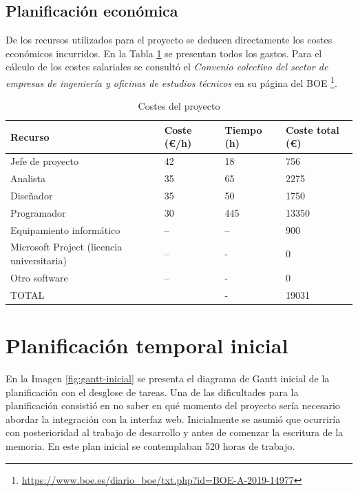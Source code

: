 \subsection{Planificación económica}

De los recursos utilizados para el proyecto se deducen directamente los costes económicos incurridos. En la Tabla \ref{tab:costes-proyecto} se presentan todos los gastos. Para el cálculo de los costes salariales se consultó el \emph{Convenio colectivo del sector de empresas de ingeniería y oficinas de estudios técnicos} en su página del BOE \footnote{\url{https://www.boe.es/diario_boe/txt.php?id=BOE-A-2019-14977}}.

\begin{table}[ht]
    \centering
    \begin{tabular}{l l l l}
        Recurso & Coste (€/h) & Tiempo (h) & Coste total (€) \\
        \hline
        \hline
        Jefe de proyecto & 42 & 18 & 756 \\
        Analista & 35 & 65 & 2275 \\
        Diseñador & 35 & 50 & 1750 \\
        Programador & 30 & 445 & 13350 \\
        Equipamiento informático & -- & -- & 900 \\
        Microsoft Project (licencia universitaria) & -- & - & 0 \\
		Otro software & -- & - & 0 \\    
        \hline
        \hline
        TOTAL & & - & 19031 \\        
    \end{tabular}
	\caption{Costes del proyecto}    
	\label{tab:costes-proyecto}
\end{table}

\section{Planificación temporal inicial}

En la Imagen \ref{fig:gantt-inicial} se presenta el diagrama de Gantt inicial de la planificación con el desglose de tareas. Una de las dificultades para la planificación consistió en no saber en qué momento del proyecto sería necesario abordar la integración con la interfaz web. Inicialmente se asumió que ocurriría con posterioridad al trabajo de desarrollo y antes de comenzar la escritura de la memoria. En este plan inicial se contemplaban 520 horas de trabajo.

